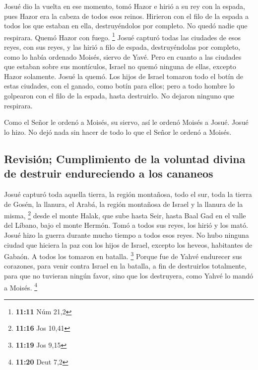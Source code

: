  Josué dio la vuelta en ese momento, tomó Hazor e hirió a
su rey con la espada, pues Hazor era la cabeza de todos esos reinos.
 Hirieron con el filo de la espada a todos los que
estaban en ella, destruyéndolos por completo. No quedó nadie que
respirara. Quemó Hazor con fuego. \footnote{\textbf{11:11} Núm 21,2}
 Josué capturó todas las ciudades de esos reyes, con sus
reyes, y las hirió a filo de espada, destruyéndolas por completo, como
lo había ordenado Moisés, siervo de Yavé.  Pero en cuanto
a las ciudades que estaban sobre sus montículos, Israel no quemó ninguna
de ellas, excepto Hazor solamente. Josué la quemó.  Los
hijos de Israel tomaron todo el botín de estas ciudades, con el ganado,
como botín para ellos; pero a todo hombre lo golpearon con el filo de la
espada, hasta destruirlo. No dejaron ninguno que respirara.

 Como el Señor le ordenó a Moisés, su siervo, así le
ordenó Moisés a Josué. Josué lo hizo. No dejó nada sin hacer de todo lo
que el Señor le ordenó a Moisés.

\hypertarget{revisiuxf3n-cumplimiento-de-la-voluntad-divina-de-destruir-endureciendo-a-los-cananeos}{%
\subsection{Revisión; Cumplimiento de la voluntad divina de destruir
endureciendo a los
cananeos}\label{revisiuxf3n-cumplimiento-de-la-voluntad-divina-de-destruir-endureciendo-a-los-cananeos}}

 Josué capturó toda aquella tierra, la región montañosa,
todo el sur, toda la tierra de Gosén, la llanura, el Arabá, la región
montañosa de Israel y la llanura de la misma, \footnote{\textbf{11:16}
  Jos 10,41}  desde el monte Halak, que sube hasta Seir,
hasta Baal Gad en el valle del Líbano, bajo el monte Hermón. Tomó a
todos sus reyes, los hirió y los mató.  Josué hizo la
guerra durante mucho tiempo a todos esos reyes.  No hubo
ninguna ciudad que hiciera la paz con los hijos de Israel, excepto los
heveos, habitantes de Gabaón. A todos los tomaron en batalla.
\footnote{\textbf{11:19} Jos 9,15}  Porque fue de Yahvé
endurecer sus corazones, para venir contra Israel en la batalla, a fin
de destruirlos totalmente, para que no tuvieran ningún favor, sino que
los destruyera, como Yahvé lo mandó a Moisés. \footnote{\textbf{11:20}
  Deut 7,2}

